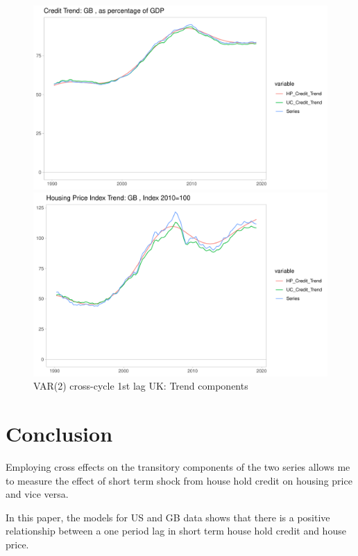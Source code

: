 \documentclass[fleqn]{article}
\begin{document}
\begin{outline}[enumerate]
		\begin{figure}[h!]
			\caption{VAR(2) cross-cycle 1st lag UK: Trend components}	
			\centerline{\includegraphics[scale=0.7]{../../Regression/VAR_2_crosscycle_1stlagonly/Output/Graphs/Credit_trend_GB.pdf}}
			\centerline{\includegraphics[scale=0.7]{../../Regression/VAR_2_crosscycle_1stlagonly/Output/Graphs/HP_trend_GB.pdf}}
		\end{figure}
		
		\clearpage
		\section{Conclusion}
		Employing cross effects on the transitory components of the two series allows me to measure the effect of short term shock from house hold credit on housing price and vice versa.
				
		In this paper, the models for US and GB data shows that there is a positive relationship between a one period lag in short term house hold credit and house price. 
		

\end{outline}
\end{document}
